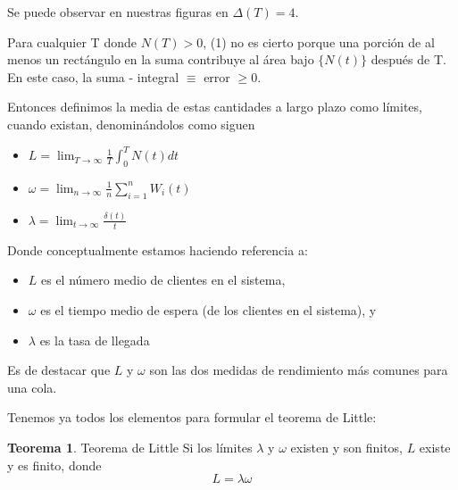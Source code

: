 \documentclass[a4paper,10pt]{scrartcl}
\theoremstyle{definition}
\newtheorem*{theorem}{Teorema}
\numberwithin{equation}{section}
\begin{document}
Se puede observar en nuestras figuras en $\Delta(T) = 4$.

Para cualquier T donde $N (T)> 0$, (1) no es cierto porque una porción de al menos un rectángulo en la suma contribuye al área bajo $\{N (t)\}$ después de T. En este caso, la suma - integral $\equiv$ error $\geq 0$.

Entonces definimos la media de estas cantidades a largo plazo como límites, cuando existan, denominándolos como siguen
\begin{itemize}
	\item $L=\lim_{T\to\infty}\frac{1}{T}\int_{0}^{T} N(t)dt$
	\item $\omega=\lim_{n\to\infty}\frac{1}{n}\sum_{i=1}^{n} W_i(t)$
	\item $\lambda=\lim_{t\to\infty}\frac{\delta(t)}{t}$
\end{itemize}

Donde conceptualmente estamos haciendo referencia a:
\begin{itemize}
	\item $L$ es el número medio de clientes en el sistema,
	\item $\omega$ es el tiempo medio de espera (de los clientes en el sistema), y
	\item $\lambda$ es la tasa de llegada 
\end{itemize}
Es de destacar que  $L$ y $\omega$ son las dos medidas de rendimiento más comunes para una cola.


Tenemos ya todos los elementos para formular el teorema de Little:
\begin{theorem}{Teorema de Little}
Si los límites $\lambda$ y $\omega$ existen y son finitos, $L$ existe y es finito, donde
\begin{equation}
L = \lambda\omega
\end{equation} 
\end{theorem}
\end{document}
